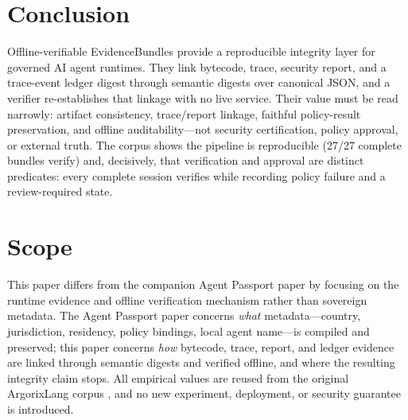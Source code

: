 \documentclass[conference]{IEEEtran}
\newcommand{\Argorix}{%
\textcolor{argViolet}{A}\textcolor{argViolet}{r}\textcolor{argIndigo}{g}\textcolor{argIndigo}{o}\textcolor{argElectric}{r}\textcolor{argElectric}{i}\textcolor{argElectric}{x}\textcolor{argCyan}{L}\textcolor{argCyan}{a}\textcolor{argCyanBright}{n}\textcolor{argCyanBright}{g}\xspace}
\begin{document}
\section{Conclusion}\label{sec:conclusion}
Offline-verifiable EvidenceBundles provide a reproducible integrity layer for governed AI
agent runtimes. They link bytecode, trace, security report, and a trace-event ledger
digest through semantic digests over canonical JSON, and a verifier re-establishes that
linkage with no live service. Their value must be read narrowly: artifact consistency,
trace/report linkage, faithful policy-result preservation, and offline auditability---not
security certification, policy approval, or external truth. The corpus shows the pipeline
is reproducible (27/27 complete bundles verify) and, decisively, that verification and
approval are distinct predicates: every complete session verifies while recording policy
failure and a review-required state.

\section{Scope}\label{sec:diff}
This paper differs from the companion Agent Passport paper by focusing on the runtime
evidence and offline verification mechanism rather than sovereign metadata. The Agent
Passport paper concerns \emph{what} metadata---country, jurisdiction, residency, policy
bindings, local agent name---is compiled and preserved; this paper concerns \emph{how}
bytecode, trace, report, and ledger evidence are linked through semantic digests and
verified offline, and where the resulting integrity claim stops. All empirical values are
reused from the original \Argorix corpus \cite{venegas2026argorixlang}, and no new
experiment, deployment, or security guarantee is introduced.



\end{document}
